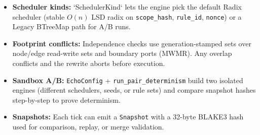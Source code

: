 \begin{itemize}
    \item \textbf{Scheduler kinds:} `SchedulerKind` lets the engine pick the default Radix scheduler (stable $O(n)$ LSD radix on \texttt{scope\_hash}, \texttt{rule\_id}, \texttt{nonce}) or a Legacy BTreeMap path for A/B runs.
    \item \textbf{Footprint conflicts:} Independence checks use generation-stamped sets over node/edge read-write sets and boundary ports (MWMR). Any overlap conflicts and the rewrite aborts before execution.
    \item \textbf{Sandbox A/B:} \texttt{EchoConfig} + \texttt{run\_pair\_determinism} build two isolated engines (different schedulers, seeds, or rule sets) and compare snapshot hashes step-by-step to prove determinism.
    \item \textbf{Snapshots:} Each tick can emit a \texttt{Snapshot} with a 32-byte BLAKE3 hash used for comparison, replay, or merge validation.
\end{itemize}
